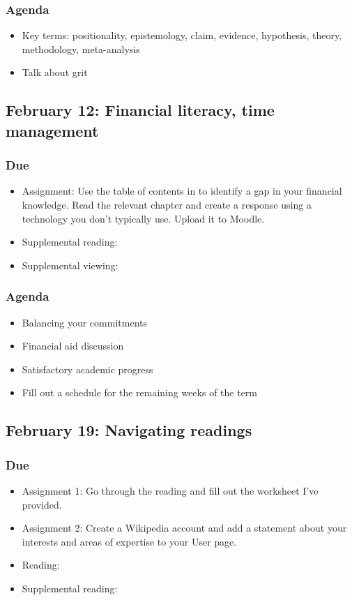 \documentclass[12pt,article,oneside]{memoir}
\begin{document}
\subsubsection{Agenda}
\begin{itemize}
\item Key terms: positionality, epistemology, claim, evidence, hypothesis, theory, methodology, meta-analysis
\item Talk about grit
\end{itemize}




\subsection{February 12: Financial literacy, time management}
\subsubsection{Due}
\begin{itemize}
 \item Assignment: Use the table of contents in \cite{everyday} to identify a gap in your financial knowledge.  Read the relevant chapter and create a response using a technology you don't typically use.  Upload it to Moodle.
 \item Supplemental reading: \cite{finra, smart}
 \item Supplemental viewing: \cite{credits}
\end{itemize}

\subsubsection{Agenda}
\begin{itemize}
\item Balancing your commitments
\item Financial aid discussion
\item Satisfactory academic progress
\item Fill out a schedule for the remaining weeks of the term
\end{itemize}



\subsection{February 19: Navigating readings}
\subsubsection{Due}
\begin{itemize}
 \item Assignment 1: Go through the reading and fill out the worksheet I've provided.
 \item Assignment 2: Create a Wikipedia account and add a statement about your interests and areas of expertise to your User page.
 \item Reading: \cite{guillory2008s}
 \item Supplemental reading: \cite{rosenberg}
\end{itemize}
\end{document}
